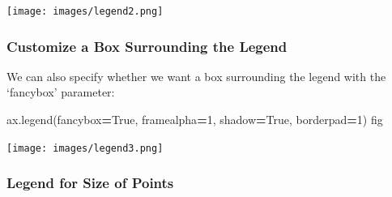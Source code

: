 \documentclass[]{book}
\newenvironment{Shaded}{\begin{snugshade}}{\end{snugshade}}
\newcommand{\DecValTok}[1]{\textcolor[rgb]{0.00,0.00,0.81}{#1}}
\newcommand{\NormalTok}[1]{#1}
\newcommand{\OperatorTok}[1]{\textcolor[rgb]{0.81,0.36,0.00}{\textbf{#1}}}
\newcommand{\VariableTok}[1]{\textcolor[rgb]{0.00,0.00,0.00}{#1}}
\begin{document}
\texttt{[image: images/legend2.png]}

\hypertarget{customize-a-box-surrounding-the-legend}{%
\subsubsection{Customize a Box Surrounding the Legend}\label{customize-a-box-surrounding-the-legend}}

We can also specify whether we want a box surrounding the legend with the `fancybox' parameter:

\begin{Shaded}
\begin{Highlighting}[]
\NormalTok{ax.legend(fancybox}\OperatorTok{=}\VariableTok{True}\NormalTok{, framealpha}\OperatorTok{=}\DecValTok{1}\NormalTok{, shadow}\OperatorTok{=}\VariableTok{True}\NormalTok{, borderpad}\OperatorTok{=}\DecValTok{1}\NormalTok{)}
\NormalTok{fig}
\end{Highlighting}
\end{Shaded}

\texttt{[image: images/legend3.png]}

\hypertarget{legend-for-size-of-points}{%
\subsubsection{Legend for Size of Points}\label{legend-for-size-of-points}}
\end{document}
